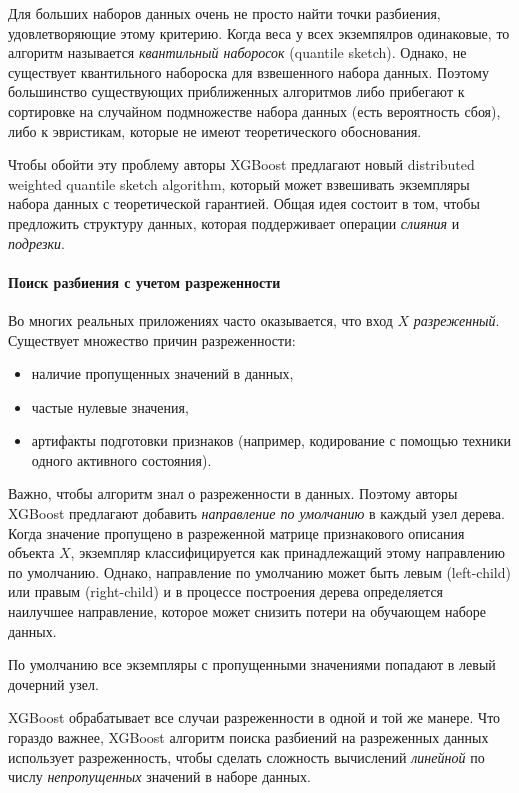 \documentclass[%
	11pt,
	a4paper,
	utf8,
		]{article}
\begin{document}
Для больших наборов данных очень не просто найти точки разбиения, удовлетворяющие этому критерию. Когда веса у всех экземпялров одинаковые, то алгоритм называется \emph{квантильный наборосок} (quantile sketch). Однако, не существует квантильного набороска для взвешенного набора данных. Поэтому большинство существующих приближенных алгоритмов либо прибегают к сортировке на случайном подмножестве набора данных (есть вероятность сбоя), либо к эвристикам, которые не имеют теоретического обоснования.

Чтобы обойти эту проблему авторы XGBoost предлагают новый distributed weighted quantile sketch algorithm, который может взвешивать экземпляры набора данных с теоретической гарантией. Общая идея состоит в том, чтобы предложить структуру данных, которая поддерживает операции \emph{слияния} и \emph{подрезки}.

\paragraph{Поиск разбиения с учетом разреженности} 

Во многих реальных приложениях часто оказывается, что вход $ X $ \emph{разреженный}. Существует множество причин разреженности:
\begin{itemize}
	\item наличие пропущенных значений в данных,
	
	\item частые нулевые значения,
	
	\item артифакты подготовки признаков (например, кодирование с помощью техники одного активного состояния).
\end{itemize}

Важно, чтобы алгоритм знал о разреженности в данных. Поэтому авторы XGBoost предлагают добавить \emph{направление по умолчанию} в каждый узел дерева. Когда значение пропущено в разреженной матрице признакового описания объекта $ X $, экземпляр классифицируется как принадлежащий этому направлению по умолчанию. Однако, направление по умолчанию может быть левым (left-child) или правым (right-child) и в процессе построения дерева определяется наилучшее направление, которое может снизить потери на обучающем наборе данных.

По умолчанию все экземпляры с пропущенными значениями попадают в левый дочерний узел.

XGBoost обрабатывает все случаи разреженности в одной и той же манере. Что гораздо важнее, XGBoost алгоритм поиска разбиений на разреженных данных использует разреженность, чтобы сделать сложность вычислений \emph{линейной} по числу \emph{непропущенных} значений в наборе данных.
\end{document}

